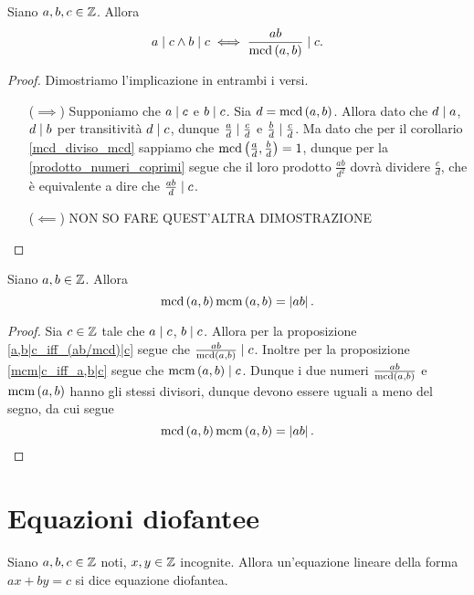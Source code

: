\begin{proposition}\label{a,b|c_iff_(ab/mcd)|c}
    Siano $a, b, c \in \mathbb{Z}$. Allora \begin{equation}
        a \mid c \land b \mid c \iff \frac{ab}{\operatorname{mcd}\left(a, b\right)} \mid c.
    \end{equation}
\end{proposition}
\begin{proof}
    Dimostriamo l'implicazione in entrambi i versi.
    \begin{itemize}
        \item[($\implies$)] Supponiamo che $a \mid c$ e $b \mid c$. Sia $d = \operatorname{mcd}\left(a, b\right)$. Allora dato che $d \mid a$, $d \mid b$ per transitività $d \mid c$, dunque $\frac{a}{d} \mid \frac{c}{d}$ e $\frac{b}{d} \mid \frac{c}{d}$. Ma dato che per il corollario \ref{mcd_diviso_mcd} sappiamo che $\operatorname{mcd}\left(\frac{a}{d}, \frac{b}{d}\right) = 1$, dunque per la \ref{prodotto_numeri_coprimi} segue che il loro prodotto $\frac{ab}{d^2}$ dovrà dividere $\frac{c}{d}$, che è equivalente a dire che $\frac{ab}{d} \mid c$.
        \item[($\impliedby$)] NON SO FARE QUEST'ALTRA DIMOSTRAZIONE \qedhere
    \end{itemize}
\end{proof}

\begin{proposition}
    \label{mcm*mcd=ab}
    Siano $a, b \in \mathbb{Z}$. Allora
    \begin{equation}
        \operatorname{mcd}\left(a, b\right)\operatorname{mcm}\left(a, b\right) = \left|ab\right|.
    \end{equation}
\end{proposition}
\begin{proof}
    Sia $c \in \mathbb{Z}$ tale che $a \mid c$, $b \mid c$. Allora per la proposizione \ref{a,b|c_iff_(ab/mcd)|c} segue che $\frac{ab}{\operatorname{mcd}\left(a, b\right)} \mid c$. Inoltre per la proposizione \ref{mcm|c_iff_a,b|c} segue che $\operatorname{mcm}\left(a, b\right) \mid c$.
    Dunque i due numeri $\frac{ab}{\operatorname{mcd}\left(a, b\right)}$ e $\operatorname{mcm}\left(a, b\right)$ hanno gli stessi divisori, dunque devono essere uguali a meno del segno, da cui segue \[
        \operatorname{mcd}\left(a, b\right)\operatorname{mcm}\left(a, b\right) = \left|ab\right|. 
    \]
\end{proof}

\section{Equazioni diofantee}

\begin{definition}
    Siano $a, b, c \in \mathbb{Z}$ noti, $x, y \in \mathbb{Z}$ incognite. Allora un'equazione lineare della forma $ax + by = c$ si dice equazione diofantea.
\end{definition}


